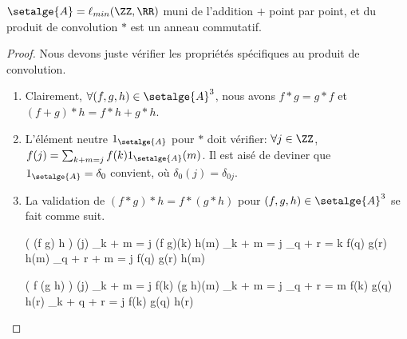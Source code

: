 
\begin{fact}
	$\setalge{A} = \ell_{min}(\ZZ , \RR)$
	muni de l'addition $+$ point par point, et du produit de convolution $\ast$
	est un anneau commutatif.
\end{fact}


\begin{proof}
	Nous devons juste vérifier les propriétés spécifiques au produit de convolution.
	\begin{enumerate}
		\item Clairement,
		$\forall (f,g,h) \in \setalge{A}^3$, nous avons
		$f \ast g = g \ast f$
		et
		$(f + g) \ast h = f \ast h + g \ast h$.


		\item L'élément neutre $1_{\setalge{A}}$ pour $\ast$ doit vérifier:
		$\forall j \in \ZZ$,
		$f(j) = \sum_{k + m = j} f(k) 1_{\setalge{A}}(m)$.
		Il est aisé de deviner que $1_{\setalge{A}} = \delta_0$ convient,
		où $\delta_{0}(j) = \delta_{0j}$.


		\item La validation de
		$(f \ast g) \ast h = f \ast (g \ast h)$
		pour
		$(f,g,h) \in \setalge{A}^3$
		se fait comme suit.

		\begin{multicols}{2}
        	\setlength{\columnseprule}{.75pt}
	
	
    		\begin{stepcalc}[style=ar*]
    			\big( (f \ast g) \ast h \big) (j)
    		\explnext{}
    			\dsum_{k + m = j} (f \ast g)(k) h(m)
    		\explnext{}
    			\dsum_{k + m = j} \dsum_{q + r = k} f(q) g(r) h(m)
    		\explnext{}
    			\dsum_{q + r + m = j} f(q) g(r) h(m)
    		\end{stepcalc}
	
	
    		\begin{stepcalc}[style=ar*]
    			\big( f \ast (g \ast h) \big) (j)
    		\explnext{}
    			\dsum_{k + m = j} f(k) (g \ast h)(m)
    		\explnext{}
    			\dsum_{k + m = j} \dsum_{q + r = m} f(k) g(q) h(r)
    		\explnext{}
    			\dsum_{k + q + r = j} f(k) g(q) h(r)
    		\end{stepcalc}
    	\end{multicols}
	\end{enumerate}
	
	\null\vspace{-8ex}
\end{proof}




